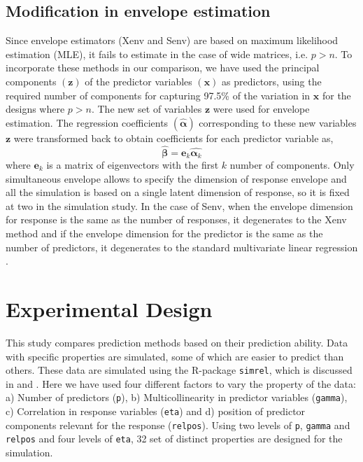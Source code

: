 \documentclass[review]{elsarticle}
\begin{document}
\subsection{Modification in envelope
estimation}\label{modification-in-envelope-estimation}

Since envelope estimators (Xenv and Senv) are based on maximum
likelihood estimation (MLE), it fails to estimate in the case of wide
matrices, i.e. \(p > n\). To incorporate these methods in our
comparison, we have used the principal components \((\mathbf{z})\) of
the predictor variables \((\mathbf{x})\) as predictors, using the
required number of components for capturing 97.5\% of the variation in
\(\mathbf{x}\) for the designs where \(p > n\). The new set of variables
\(\mathbf{z}\) were used for envelope estimation. The regression
coefficients \((\hat{\boldsymbol{\alpha}})\) corresponding to these new
variables \(\mathbf{z}\) were transformed back to obtain coefficients
for each predictor variable as,
\[\hat{\boldsymbol{\beta}} = \mathbf{e}_k\hat{\boldsymbol{\alpha}_k}\]
where \(\mathbf{e}_k\) is a matrix of eigenvectors with the first \(k\)
number of components. Only simultaneous envelope allows to specify the
dimension of response envelope and all the simulation is based on a
single latent dimension of response, so it is fixed at two in the
simulation study. In the case of Senv, when the envelope dimension for
response is the same as the number of responses, it degenerates to the
Xenv method and if the envelope dimension for the predictor is the same
as the number of predictors, it degenerates to the standard multivariate
linear regression \citep{env2018}.

\hypertarget{experimental-design}{\section{Experimental
Design}\label{experimental-design}}

This study compares prediction methods based on their prediction
ability. Data with specific properties are simulated, some of which are
easier to predict than others. These data are simulated using the
R-package \texttt{simrel}, which is discussed in \citet{saebo2015simrel}
and \citet{Rimal2018}. Here we have used four different factors to vary
the property of the data: a) Number of predictors (\texttt{p}), b)
Multicollinearity in predictor variables (\texttt{gamma}), c)
Correlation in response variables (\texttt{eta}) and d) position of
predictor components relevant for the response (\texttt{relpos}). Using
two levels of \texttt{p}, \texttt{gamma} and \texttt{relpos} and four
levels of \texttt{eta}, 32 set of distinct properties are designed for
the simulation.
\end{document}
